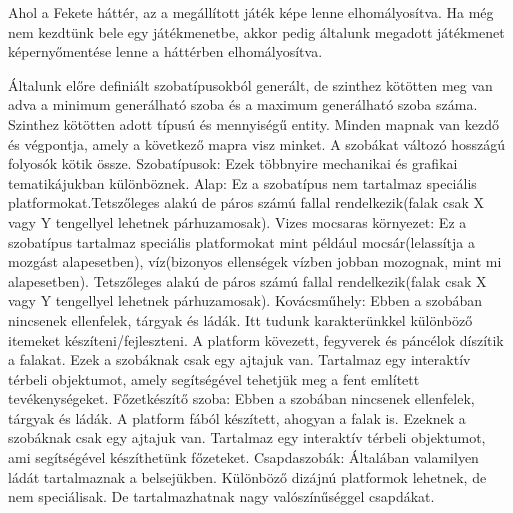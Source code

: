 Ahol a Fekete háttér, az a megállított játék képe lenne elhomályosítva.
Ha még nem kezdtünk bele egy játékmenetbe, akkor pedig általunk megadott játékmenet képernyőmentése lenne a háttérben elhomályosítva.


Általunk előre definiált szobatípusokból generált, de szinthez kötötten meg van adva a minimum generálható szoba és a maximum generálható szoba száma.
Szinthez kötötten adott típusú és mennyiségű entity.
Minden mapnak van kezdő és végpontja, amely a következő mapra visz minket.
A szobákat változó hosszágú folyosók kötik össze.
Szobatípusok:
Ezek többnyire mechanikai és grafikai tematikájukban különböznek.
Alap:
Ez a szobatípus nem tartalmaz speciális platformokat.Tetszőleges alakú de páros számú fallal rendelkezik(falak csak X vagy Y tengellyel lehetnek párhuzamosak).
Vizes mocsaras környezet:
Ez a szobatípus tartalmaz speciális platformokat mint például mocsár(lelassítja a mozgást alapesetben), víz(bizonyos ellenségek vízben jobban mozognak, mint mi alapesetben).
Tetszőleges alakú de páros számú fallal rendelkezik(falak csak X vagy Y tengellyel lehetnek párhuzamosak).
Kovácsműhely:
Ebben a szobában nincsenek ellenfelek, tárgyak és ládák. Itt tudunk karakterünkkel különböző itemeket készíteni/fejleszteni. A platform kövezett, fegyverek és páncélok díszítik a falakat. Ezek a szobáknak csak egy ajtajuk van. Tartalmaz egy interaktív térbeli objektumot, amely segítségével tehetjük meg a fent említett tevékenységeket.
Főzetkészítő szoba: 
Ebben a szobában nincsenek ellenfelek, tárgyak és ládák. A platform fából készített, ahogyan a falak is. Ezeknek a szobáknak csak egy ajtajuk van. Tartalmaz egy interaktív térbeli objektumot, ami segítségével készíthetünk főzeteket.
Csapdaszobák:
Általában valamilyen ládát tartalmaznak a belsejükben.
Különböző dizájnú platformok lehetnek, de nem speciálisak. De tartalmazhatnak nagy valószínűséggel csapdákat.

